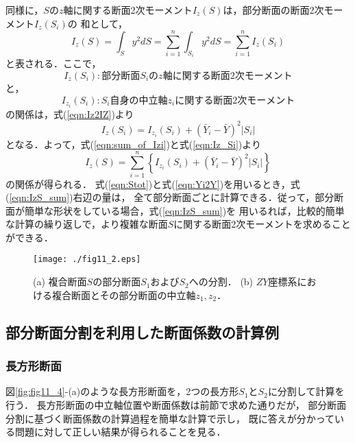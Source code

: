 ﻿\documentclass[10pt,a4j]{jbook}
\begin{document}
同様に，$S$の$z$軸に関する断面2次モーメント$I_z(S)$は，部分断面の断面2次モーメント$I_z(S_i)$の
和として，
\begin{equation}
	I_z(S)=\int_S y^2 dS=\sum_{i=1}^n\int_{S_i} y^2dS=\sum_{i=1}^n I_z(S_i)
	\label{eqn:sum_of_Izi}
\end{equation}
と表される．ここで，
\[
	I_z(S_i): 部分断面S_iのz軸に関する断面2次モーメント
\]
と，
\[
	I_{z_i}(S_i): S_i自身の中立軸z_iに関する断面2次モーメント
\]
の関係は，式(\ref{eqn:Iz2IZ})より
\begin{equation}
	I_z(S_i)=I_{z_i}(S_i)+\left( \bar Y_i-\bar{Y} \right)^2 \left|S_i\right|
	\label{eqn:Iz_Si}
\end{equation}
となる．よって，式(\ref{eqn:sum_of_Izi})と式(\ref{eqn:Iz_Si})より
\begin{equation}
	I_z(S)=
	\sum_{i=1}^n\left\{
		I_{z_i}(S_i)+\left( \bar Y_i-\bar{Y} \right)^2 \left|S_i\right|
	\right\}
	\label{eqn:IzS_sum}
\end{equation}
の関係が得られる．
式(\ref{eqn:Stot})と式(\ref{eqn:Yi2Y})を用いるとき，式(\ref{eqn:IzS_sum})右辺の量は，
全て部分断面ごとに計算できる．従って，部分断面が簡単な形状をしている場合，式(\ref{eqn:IzS_sum})を
用いるれば，比較的簡単な計算の繰り返しで，より複雑な断面$S$に関する断面2次モーメントを求めることができる．
\begin{figure}[h]
	\begin{center}
	\texttt{[image: ./fig11\_2.eps]} 
	\end{center}
	\caption{
		(a) 複合断面$S$の部分断面$S_1$および$S_2$への分割．
		(b) $ZY$座標系における複合断面とその部分断面の中立軸$z_1,z_2$．
	} 
	\label{fig:fig11_2}
\end{figure}
\subsection{部分断面分割を利用した断面係数の計算例}
\subsubsection{長方形断面}
図\ref{fig:fig11_4}-(a)のような長方形断面を，2つの長方形$S_1$と$S_2$に分割して計算を行う．
長方形断面の中立軸位置や断面係数は前節で求めた通りだが，
部分断面分割に基づく断面係数の計算過程を簡単な計算で示し，
既に答えが分かっている問題に対して正しい結果が得られることを見る．
\end{document}
